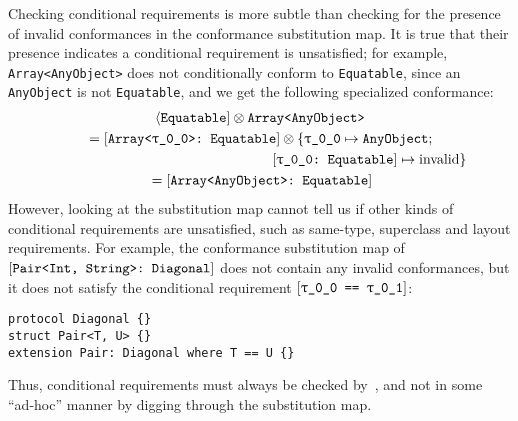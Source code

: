 \documentclass[../generics]{subfiles}
\begin{document}
Checking conditional requirements is more subtle than checking for the presence of invalid conformances in the conformance substitution map. It is true that their presence indicates a conditional requirement is unsatisfied; for example, \texttt{Array<AnyObject>} does not conditionally conform to \texttt{Equatable}, since an \texttt{AnyObject} is not \texttt{Equatable}, and we get the following specialized conformance:
\begin{gather*} %
\Proto{Equatable} \otimes \texttt{Array<AnyObject>}\\
{} = \ConfReq{Array<\rT>}{Equatable} \otimes \SubstMapC{\SubstType{\rT}{AnyObject}}{\\
\phantom{{} = \ConfReq{Array<\rT>}{Equatable} \otimes \{} \ConfReq{\rT}{Equatable}\mapsto\text{invalid}}\\
{} = \ConfReq{Array<AnyObject>}{Equatable}
\end{gather*}
However, looking at the substitution map cannot tell us  if other kinds of conditional requirements are unsatisfied, such as same-type, superclass and layout requirements. For example, the conformance substitution map of $[\texttt{Pair<Int, String>:~Diagonal}]$ does not contain any invalid conformances, but it does not satisfy the conditional requirement $\SameReq{\rT}{\rU}$:
\begin{Verbatim}
protocol Diagonal {}
struct Pair<T, U> {}
extension Pair: Diagonal where T == U {}
\end{Verbatim}
Thus, conditional requirements must always be checked by~, and not in some ``ad-hoc'' manner by digging through the substitution map.
\end{document}

